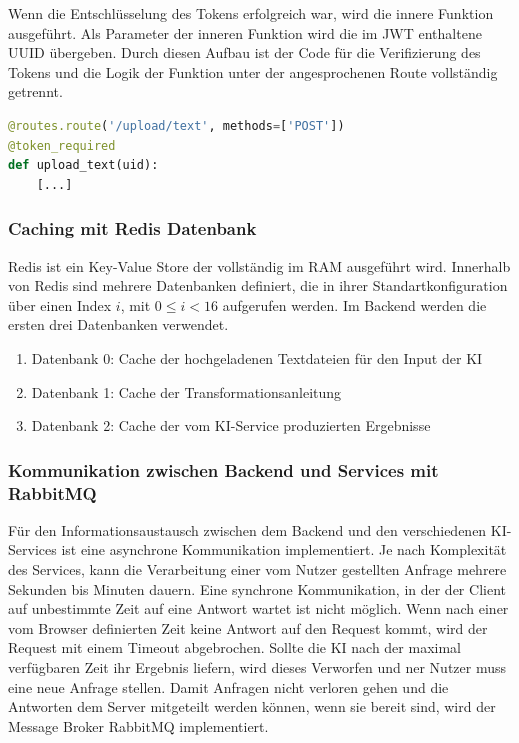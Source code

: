 Wenn die Entschlüsselung des Tokens erfolgreich war, wird die innere Funktion ausgeführt. Als Parameter der inneren Funktion wird die im JWT enthaltene UUID übergeben. Durch diesen Aufbau ist der Code für die Verifizierung des Tokens und die Logik der Funktion unter der angesprochenen Route vollständig getrennt.

\begin{lstlisting}[language=Python]
@routes.route('/upload/text', methods=['POST'])
@token_required
def upload_text(uid):
    [...]
\end{lstlisting}

\subsubsection{Caching mit Redis Datenbank}
Redis ist ein Key-Value Store der vollständig im RAM ausgeführt wird. Innerhalb von Redis sind mehrere Datenbanken definiert, die in ihrer Standartkonfiguration über einen Index $i$, mit $0\leq{}i<16$ aufgerufen werden. Im Backend werden die ersten drei Datenbanken verwendet.
\begin{enumerate}
 \item Datenbank 0: Cache der hochgeladenen Textdateien für den Input der KI
 \item Datenbank 1: Cache der Transformationsanleitung
 \item Datenbank 2: Cache der vom KI-Service produzierten Ergebnisse
\end{enumerate} 

\subsubsection{Kommunikation zwischen Backend und Services mit RabbitMQ}
Für den Informationsaustausch zwischen dem Backend und den verschiedenen KI-Services ist eine asynchrone Kommunikation implementiert. Je nach Komplexität des Services, kann die Verarbeitung einer vom Nutzer gestellten Anfrage mehrere Sekunden bis Minuten dauern. Eine synchrone Kommunikation, in der der Client auf unbestimmte Zeit auf eine Antwort wartet ist nicht möglich. Wenn nach einer vom Browser definierten Zeit keine Antwort auf den Request kommt, wird der Request mit einem Timeout abgebrochen. Sollte die KI nach der maximal verfügbaren Zeit ihr Ergebnis liefern, wird dieses Verworfen und ner Nutzer muss eine neue Anfrage stellen. Damit Anfragen nicht verloren gehen und die Antworten dem Server mitgeteilt werden können, wenn sie bereit sind, wird der Message Broker RabbitMQ implementiert. 


